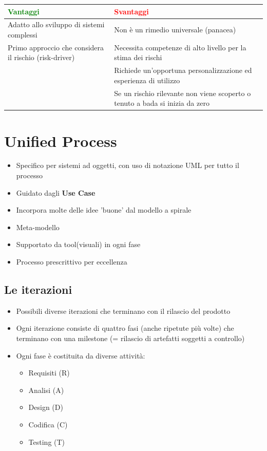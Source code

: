 \documentclass[12pt, a4paper]{report}
\begin{document}
\begin{center}
    \begin{tabular}{|p{}|p{}|}
        \hline
        \textbf{\textcolor{green}{Vantaggi}} & \textbf{\textcolor{red}{Svantaggi}} \\
        \hline
        Adatto allo sviluppo di sistemi complessi & Non è un rimedio universale (panacea) \\
        \hline
        Primo approccio che considera il rischio (risk-driver) & Necessita competenze di alto livello per la stima dei rischi \\
        \hline
        & Richiede  un'opportuna personalizzazione ed esperienza di utilizzo \\
        \hline
        & Se un rischio rilevante non viene scoperto o tenuto a bada si inizia da zero \\
        \hline
    \end{tabular}
\end{center}
\section{Unified Process}
\begin{itemize}
    \item Specifico per sistemi ad oggetti, con uso di notazione UML per tutto il processo
    \item Guidato dagli \textbf{Use Case}
    \item Incorpora molte delle idee 'buone' dal modello a spirale
    \item Meta-modello
    \item Supportato da tool(visuali) in ogni fase
    \item Processo prescrittivo per eccellenza
\end{itemize}
\subsection{Le iterazioni}
\begin{itemize}
    \item Possibili diverse iterazioni che terminano con il rilascio del prodotto
    \item Ogni iterazione consiste di quattro fasi (anche ripetute più volte) che terminano con una milestone (= rilascio di artefatti soggetti a controllo)
    \item Ogni fase è costituita da diverse attività: \begin{itemize}
        \item Requisiti (R)
        \item Analisi (A)
        \item Design (D)
        \item Codifica (C)
        \item Testing (T)
    \end{itemize}
\end{itemize}
\end{document}
